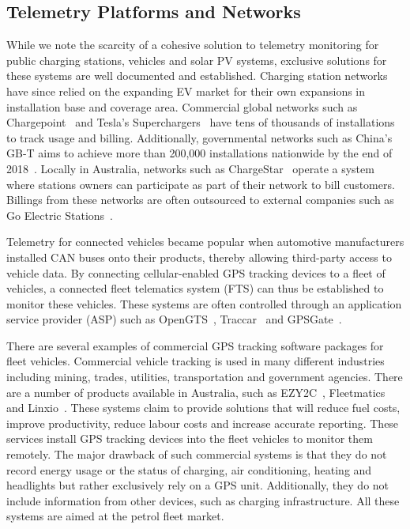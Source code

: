 \subsection{Telemetry Platforms and Networks}
While we note the scarcity of a cohesive solution to telemetry monitoring for public charging stations, vehicles and solar PV systems, exclusive solutions for these systems are well documented and established. Charging station networks have since relied on the expanding EV market for their own expansions in installation base and coverage area. Commercial global networks such as Chargepoint~\cite{chargepoint_inc_chargepoint_nodate} and Tesla’s Superchargers~\cite{tesla_supercharger_nodate} have tens of thousands of installations to track usage and billing. Additionally, governmental networks such as China’s GB-T aims to achieve more than 200,000 installations nationwide by the end of 2018~\cite{china_electric_vehicle_charging_infrastructure_promotion_alliance_zhongguo_2017}. Locally in Australia, networks such as ChargeStar~\cite{chargestar_chargestar_nodate} operate a system where stations owners can participate as part of their network to bill customers. Billings from these networks are often outsourced to external companies such as Go Electric Stations~\cite{go_electric_stations_s.r.l.s_go_nodate}.

Telemetry for connected vehicles became popular when automotive manufacturers installed CAN buses onto their products, thereby allowing third-party access to vehicle data.  By connecting cellular-enabled GPS tracking devices to a fleet of vehicles, a connected fleet telematics system (FTS) can thus be established to monitor these vehicles. These systems are often controlled through an application service provider (ASP) such as OpenGTS~\cite{geotelematic_solutions_inc._opengts_nodate}, Traccar~\cite{traccar_ltd_traccar_nodate} and GPSGate~\cite{gpsgate_ab_gpsgate_nodate}. 


There are several examples of commercial GPS tracking software packages for fleet vehicles. Commercial vehicle tracking is used in many different industries including mining, trades, utilities, transportation and government agencies. There are a number of products available in Australia, such as EZY2C~\cite{netstar_ezy2c_nodate}, Fleetmatics~\cite{verizon_fleetmatics_nodate} and Linxio~\cite{linxio_linxio_nodate}. These systems claim to provide solutions that will reduce fuel costs, improve productivity, reduce labour costs and increase accurate reporting. These services install GPS tracking devices into the fleet vehicles to monitor them remotely. The major drawback of such commercial systems is that they do not record energy usage or the status of charging, air conditioning, heating and headlights but rather exclusively rely on a GPS unit. Additionally, they do not include information from other devices, such as charging infrastructure. All these systems are aimed at the petrol fleet market.

